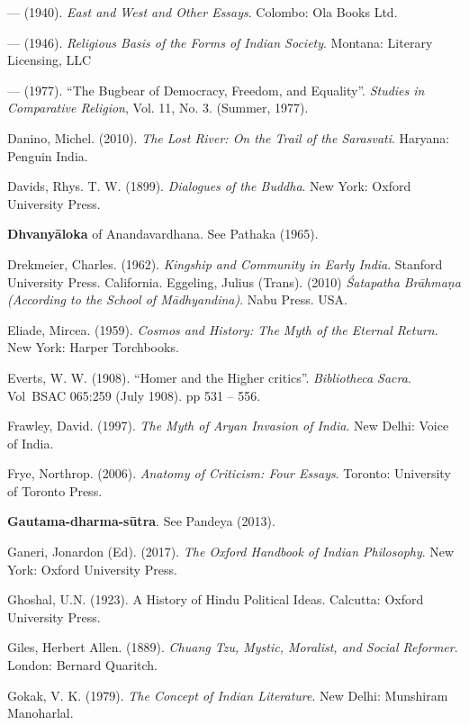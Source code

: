 \begin{thebibliography}{99}
--- (1940). {\sl East and West and Other Essays}. Colombo: Ola Books Ltd. 

--- (1946). {\sl Religious Basis of the Forms of Indian Society}. Montana: Literary Licensing, LLC

--- (1977). “The Bugbear of Democracy, Freedom, and Equality”. {\sl Studies in Comparative Religion}, Vol. 11, No. 3. (Summer, 1977). 

Danino, Michel. (2010). {\sl The Lost River: On the Trail of the Sarasvati}. Haryana: Penguin India.  

Davids, Rhys. T. W. (1899). {\sl Dialogues of the Buddha}. New York: Oxford University Press. 

{\bf Dhvanyāloka} of Anandavardhana. See Pathaka (1965).

Drekmeier, Charles. (1962). {\sl Kingship and Community in Early India}. Stanford University Press. California. Eggeling, Julius (Trans). (2010) {\sl Śatapatha Brāhmaṇa (According to the School of Mādhyandina)}. Nabu Press. USA. 

Eliade, Mircea. (1959). {\sl Cosmos and History: The Myth of the Eternal Return}. New York: Harper Torchbooks. 

Everts, W. W. (1908). “Homer and the Higher critics”. {\sl Bibliotheca Sacra}. Vol BSAC 065:259 (July 1908). pp 531 – 556. 

Frawley, David. (1997). {\sl The Myth of Aryan Invasion of India}.  New Delhi: Voice of India. 

Frye, Northrop. (2006). {\sl Anatomy of Criticism: Four Essays}. Toronto: University of Toronto Press. 

{\bf Gautama-dharma-sūtra}. See Pandeya (2013). 

Ganeri, Jonardon (Ed). (2017). {\sl The Oxford Handbook of Indian Philosophy}. New York: Oxford University Press. 

Ghoshal, U.N. (1923). A History of Hindu Political Ideas. Calcutta: Oxford University Press. 

Giles, Herbert Allen. (1889). {\sl Chuang Tzu, Mystic, Moralist, and Social Reformer}. London: Bernard Quaritch. 

Gokak, V. K.  (1979). {\sl The Concept of Indian Literature}. New Delhi: Munshiram Manoharlal. 


\end{thebibliography}
